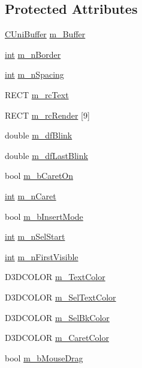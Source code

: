 \subsection*{Protected Attributes}
\begin{DoxyCompactItemize}
\item 
\hyperlink{class_c_uni_buffer}{CUniBuffer} \hyperlink{class_c_d_x_u_t_edit_box_afb55f6d88b6d994cf61227f7afb5f719}{m\_\-Buffer}
\item 
\hyperlink{_d_x_u_tgui_8cpp_a2d77ed03302b6978834ee3b6f57837fb}{int} \hyperlink{class_c_d_x_u_t_edit_box_ae4930c5e75aab5ff2b367ac9acdac18f}{m\_\-nBorder}
\item 
\hyperlink{_d_x_u_tgui_8cpp_a2d77ed03302b6978834ee3b6f57837fb}{int} \hyperlink{class_c_d_x_u_t_edit_box_a7d9ac282370b9a8f67994cc4a82df00e}{m\_\-nSpacing}
\item 
RECT \hyperlink{class_c_d_x_u_t_edit_box_a3ccb7a43b360576571463ae1f38ec111}{m\_\-rcText}
\item 
RECT \hyperlink{class_c_d_x_u_t_edit_box_ab65b28d8d4846c70ab893c2117047750}{m\_\-rcRender} \mbox{[}9\mbox{]}
\item 
double \hyperlink{class_c_d_x_u_t_edit_box_a487954472ae7688f22aaf01f719a4114}{m\_\-dfBlink}
\item 
double \hyperlink{class_c_d_x_u_t_edit_box_aea2dc193c118915719b7905896e1ed3f}{m\_\-dfLastBlink}
\item 
bool \hyperlink{class_c_d_x_u_t_edit_box_a2a7a67ef2c2104a2d62a00517915f59b}{m\_\-bCaretOn}
\item 
\hyperlink{_d_x_u_tgui_8cpp_a2d77ed03302b6978834ee3b6f57837fb}{int} \hyperlink{class_c_d_x_u_t_edit_box_a148a39c11d4b189d2bbf37e45e74d6d6}{m\_\-nCaret}
\item 
bool \hyperlink{class_c_d_x_u_t_edit_box_adb1eaad549f7da1b5eca182d45454fc3}{m\_\-bInsertMode}
\item 
\hyperlink{_d_x_u_tgui_8cpp_a2d77ed03302b6978834ee3b6f57837fb}{int} \hyperlink{class_c_d_x_u_t_edit_box_abe8996fe747a8a8244ded9f65b192e21}{m\_\-nSelStart}
\item 
\hyperlink{_d_x_u_tgui_8cpp_a2d77ed03302b6978834ee3b6f57837fb}{int} \hyperlink{class_c_d_x_u_t_edit_box_a4f20f987232887403d1234cd275a5e30}{m\_\-nFirstVisible}
\item 
D3DCOLOR \hyperlink{class_c_d_x_u_t_edit_box_a4007e072bfbf278bc3cadca555e48ced}{m\_\-TextColor}
\item 
D3DCOLOR \hyperlink{class_c_d_x_u_t_edit_box_af7ad30e9b036e11cc008d6061e50fb5c}{m\_\-SelTextColor}
\item 
D3DCOLOR \hyperlink{class_c_d_x_u_t_edit_box_a823226b75c0622be3af28a45fedfaeb8}{m\_\-SelBkColor}
\item 
D3DCOLOR \hyperlink{class_c_d_x_u_t_edit_box_a9b0c3fb3ddfebd5780f1656048a83c1c}{m\_\-CaretColor}
\item 
bool \hyperlink{class_c_d_x_u_t_edit_box_a09b9f704dcf36c70e025c30d32d5d218}{m\_\-bMouseDrag}
\end{DoxyCompactItemize}

